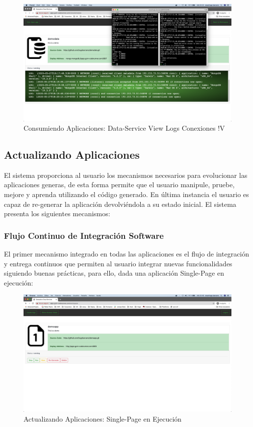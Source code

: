 \documentclass[a4paper,11pt]{book}
\begin{document}
\begin{figure}[H]
\centering
\includegraphics[scale=0.2]{imagenes/casouso/1_17.png}
\caption{ Consumiendo Aplicaciones: Data-Service View Logs Conexiones !V   }
\end{figure}



\subsection{Actualizando Aplicaciones}

El sistema proporciona al usuario los mecanismos necesarios para evolucionar las aplicaciones generas, de esta forma permite que el usuario manipule, pruebe, mejore y aprenda utilizando el código generado. En última instancia el usuario es capaz de re-generar la aplicación devolviéndola a su estado inicial. El sistema presenta los siguientes mecanismos:

\subsubsection{Flujo Continuo de Integración Software}

El primer mecanismo integrado en todas las aplicaciones es el flujo de integración y entrega continuos que permiten al usuario integrar nuevas funcionalidades siguiendo buenas prácticas, para ello, dada una aplicación Single-Page en ejecución:

\begin{figure}[H]
\centering
\includegraphics[scale=0.2]{imagenes/casouso/2_1.png}
\caption{ Actualizando Aplicaciones: Single-Page en Ejecución  }
\end{figure}
\end{document}
